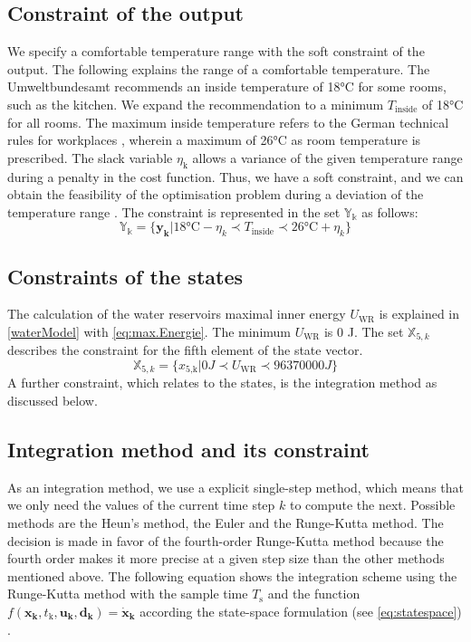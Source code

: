 \subsection{Constraint of the output}
\label{subsec:constrainY}
We specify a comfortable temperature range with the soft constraint of the output. The following explains the range of a comfortable temperature.\newline
The Umweltbundesamt \cite{Umweltbundesamt.7.10.2021} recommends an inside temperature of 18°C for some rooms, such as the kitchen. We expand the recommendation to a minimum $T_\text{inside}$ of 18°C for all rooms. The maximum inside temperature refers to the German technical rules for workplaces \cite{Bund.2021}, wherein a maximum of 26°C as room temperature is prescribed. The slack variable $\eta_\text{k}$ allows a variance of the given temperature range during a penalty in the cost function. Thus, we have a soft constraint, and we can obtain the feasibility of the optimisation problem during a deviation of the temperature range \cite{Drgona.2020}. The constraint is represented in the set $\mathbb{Y_k}$ as follows:  
\begin{equation}
    \label{ConstraintY}
    \mathbb{Y_k} = \{\mathbf{y_k}| 18 \text{°C} - \eta_k \prec T_\text{inside} \prec 26 \text{°C}+ \eta_k\} 
\end{equation}

\subsection{Constraints of the states}
\label{ConstraintX}

The calculation of the water reservoirs maximal inner energy $U_\text{WR}$ is explained in \autoref{waterModel} with \autoref{eq:max.Energie}. The minimum $U_\text{WR}$ is 0 J. The set $\mathbb{X}_{5,k}$ describes the constraint for the fifth element of the state vector.
\begin{equation}
    \label{ConstraintX5}
    \mathbb{X}_{5,k} = \{x_\text{5,k}| 0 J \prec U_\text{WR} \prec 96370000 J\} 
\end{equation}
A further constraint, which relates to the states, is the integration method as discussed below.

\subsection{Integration method and its constraint}
\label{COnstaintIntegration}
As an integration method, we use a explicit single-step method, which means that we only need the values of the current time step $k$ to compute the next. Possible methods are the Heun's method, the Euler and the Runge-Kutta method. The decision is made in favor of the fourth-order Runge-Kutta method because the fourth order makes it more precise at a given step size than the other methods mentioned above. The following equation shows the integration scheme using the Runge-Kutta method with the sample time $T_\text{s}$ and the function $f(\mathbf{x_k},t_\text{k},\mathbf{u_k},\mathbf{d_k}) = \mathbf{\dot{x}_\text{k}}$ according the state-space formulation (see \autoref{eq:statespace}) \cite{KaiFurmansMarcusGeimerBalazsPritzCarstenProppe.WS1920}.

